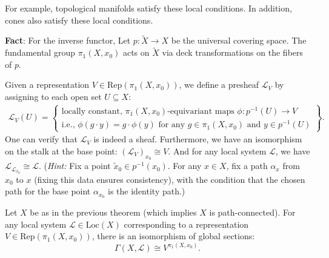 \begin{remark}
    For example, topological manifolds satisfy these local conditions. 
    In addition, cones also satisfy these local conditions.
\end{remark}

\textbf{Fact}:
For the inverse functor,
Let $p: \tilde{X} \rightarrow X$ be the universal covering space. The fundamental group $\pi_1(X, x_0)$ acts on $\tilde{X}$ via deck transformations on the fibers of $p$. 

Given a representation $V \in \mathrm{Rep}(\pi_1(X, x_0))$, we define a presheaf $\mathcal{L}_V$ by assigning to each open set $U \subseteq X$:
\begin{align*}
\mathcal{L}_V(U) = \left\{ 
\begin{array}{l}
\text{locally constant, } \pi_1(X, x_0)\text{-equivariant maps } \phi: p^{-1}(U) \rightarrow V \\
\text{i.e., } \phi(g \cdot y) = g \cdot \phi(y) \text{ for any } g \in \pi_1(X, x_0) \text{ and } y \in p^{-1}(U)
\end{array} 
\right\}.
\end{align*}
One can verify that $\mathcal{L}_V$ is indeed a sheaf. Furthermore, we have an isomorphism on the stalk at the base point: $(\mathcal{L}_V)_{x_0} \cong V$. 
And for any local system $\mathcal{L}$, we have $\mathcal{L}_{\mathcal{L}_{x_0}} \cong \mathcal{L}$.
(\textit{Hint:} Fix a point $\tilde{x}_0 \in p^{-1}(x_0)$. For any $x \in X$, fix a path $\alpha_x$ from $x_0$ to $x$ (fixing this data ensures consistency), with the condition that the chosen path for the base point $\alpha_{x_0}$ is the identity path.)

\begin{lemma}
Let $X$ be as in the previous theorem (which implies $X$ is path-connected). For any local system $\mathcal{L} \in \mathrm{Loc}(X)$ corresponding to a representation $V \in \mathrm{Rep}(\pi_1(X, x_0))$, there is an isomorphism of global sections:
\[ \Gamma(X, \mathcal{L}) \cong V^{\pi_1(X, x_0)}. \]
\end{lemma}

